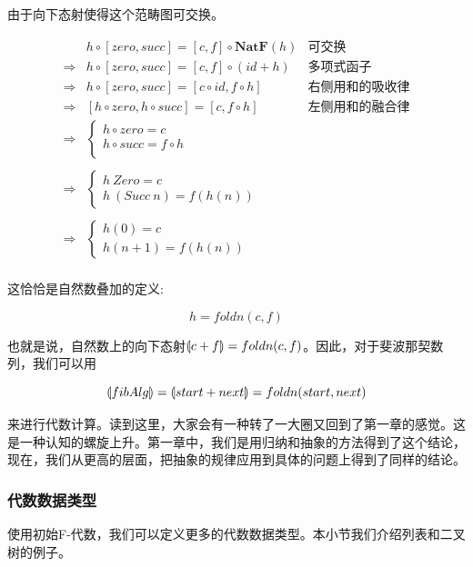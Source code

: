 \documentclass[b5paper]{ctexart}
\begin{document}
由于向下态射使得这个范畴图可交换。

\[
\begin{array}{rll}
            & h \circ [zero, succ] = [c, f] \circ \mathbf{NatF}(h) & \text{可交换} \\
\Rightarrow & h \circ [zero, succ] = [c, f] \circ (id + h) & \text{多项式函子} \\
\Rightarrow & h \circ [zero, succ] = [c \circ id, f \circ h] & \text{右侧用和的吸收律} \\
\Rightarrow & [h \circ zero, h \circ succ] = [c, f \circ h] & \text{左侧用和的融合律} \\
\Rightarrow &
  \begin{cases}
    h \circ zero = c \\
    h \circ succ = f \circ h \\
  \end{cases} & \\
\\
\Rightarrow &
  \begin{cases}
    h\ Zero = c \\
    h\ (Succ\ n) = f(h(n))
  \end{cases} & \\
\\
\Rightarrow &
  \begin{cases}
    h(0) = c \\
    h(n + 1) = f(h(n))
  \end{cases} & \\
\end{array}
\]

这恰恰是自然数叠加的定义:

\[
  h = foldn(c, f)
\]

也就是说，自然数上的向下态射$\llparenthesis c + f \rrparenthesis = foldn(c, f)$。因此，对于斐波那契数列，我们可以用

\[
\llparenthesis fibAlg \rrparenthesis = \llparenthesis start + next \rrparenthesis = foldn(start, next)
\]

来进行代数计算。读到这里，大家会有一种转了一大圈又回到了第一章的感觉。这是一种认知的螺旋上升。第一章中，我们是用归纳和抽象的方法得到了这个结论，现在，我们从更高的层面，把抽象的规律应用到具体的问题上得到了同样的结论。

\subsubsection{代数数据类型}

使用初始F-代数，我们可以定义更多的代数数据类型。本小节我们介绍列表和二叉树的例子。
\end{document}
